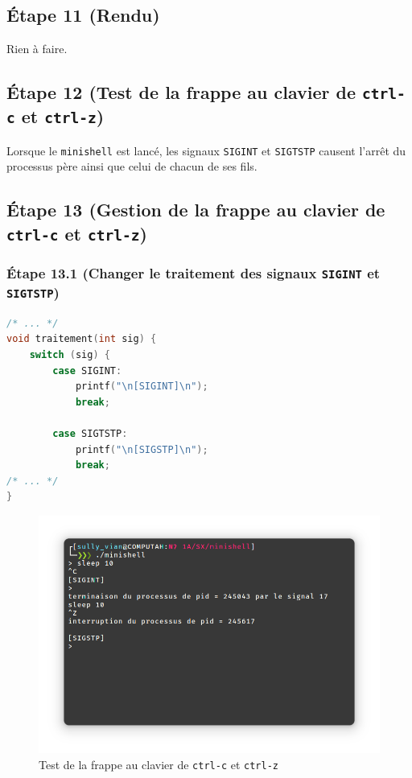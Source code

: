 \documentclass{article}
\begin{document}
\subsection*{Étape 11 (Rendu)}

Rien à faire.

\subsection*{Étape 12 (Test de la frappe au clavier de \texttt{ctrl-c} et \texttt{ctrl-z})}

Lorsque le \texttt{minishell} est lancé, les signaux \texttt{SIGINT} et \texttt{SIGTSTP} causent l'arrêt du processus père ainsi que celui de chacun de ses fils.

\subsection*{Étape 13 (Gestion de la frappe au clavier de \texttt{ctrl-c} et \texttt{ctrl-z})}

\subsubsection*{Étape 13.1 (Changer le traitement des signaux \texttt{SIGINT} et \texttt{SIGTSTP})}

\begin{lstlisting}[language=C, caption=ajout de la question 13.1]
/* ... */
void traitement(int sig) {
    switch (sig) {
        case SIGINT:
            printf("\n[SIGINT]\n");
            break;

        case SIGTSTP:
            printf("\n[SIGSTP]\n");
            break;
/* ... */
}
\end{lstlisting}

\begin{figure}[H]
    \centering
    \includegraphics[width=\textwidth]{./resources/E13.1.png}
    \caption{Test de la frappe au clavier de \texttt{ctrl-c} et \texttt{ctrl-z}}
    \label{fig:E13.1}
\end{figure}
\end{document}
